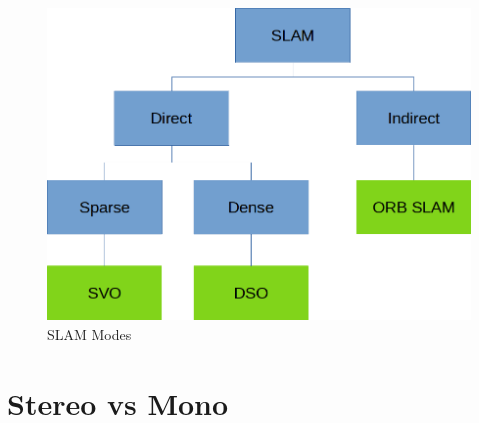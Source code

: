 \documentclass[11pt,a4paper,titlepage,oneside]{report}
\begin{document}
\begin{figure}[H]
	\includegraphics[width=1.0\textwidth]{img/slam_modes.png}
	\caption{SLAM Modes}\label{fig:slammodes}
\end{figure}

\section{Stereo vs Mono}
\end{document}
